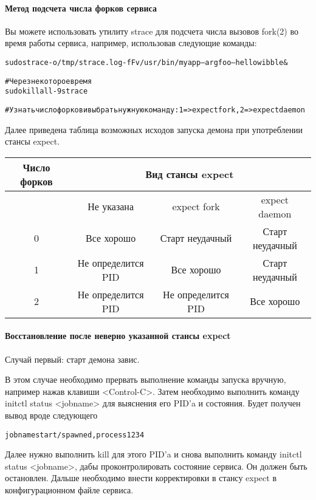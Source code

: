 \paragraph{Метод подсчета числа форков сервиса}
Вы можете использовать утилиту strace для подсчета числа вызовов fork(2) во время работы сервиса, например, использовав следующие команды: \begin{alltt}
sudo strace -o /tmp/strace.log -fFv /usr/bin/myapp --arg foo --hello wibble &

#Через некоторое время
sudo killall -9 strace

#Узнать число форков и выбрать нужную команду: 1=> expect fork, 2=> expect daemon
\end{alltt}

Далее приведена таблица возможных исходов запуска демона при употреблении стансы expect. 
\begin{table}[Ht!]
\begin{tabular}{cccc}
\hline Число форков \vline & \multicolumn{3}{c}{Вид стансы expect} \\
\hline & Не указана & expect fork & expect daemon \\
\hline 0 \vline & Все хорошо & Старт неудачный & Старт неудачный \\
\hline 1 \vline & Не определится PID & Все хорошо & Старт неудачный  \\
\hline 2 \vline & Не определится PID  & Не определится PID & Все хорошо  \\
\hline
\end{tabular} 
\end{table}

\paragraph{Восстановление после неверно указанной стансы expect}
Случай первый: старт демона завис.  

В этом случае необходимо прервать выполнение команды запуска вручную, например нажав клавиши <Control-C>. Затем необходимо выполнить команду initctl status <jobname> для выяснения его PID'a и состояния. 
Будет получен вывод вроде следующего \begin{alltt}
jobname start/spawned, process 1234
\end{alltt}
Далее нужно выполнить kill для этого PID'a и снова выполнить команду initctl status <jobname>, дабы проконтролировать состояние сервиса. Он должен быть остановлен. Дальше необходимо внести корректировки в стансу expect в конфигурационном файле сервиса.

